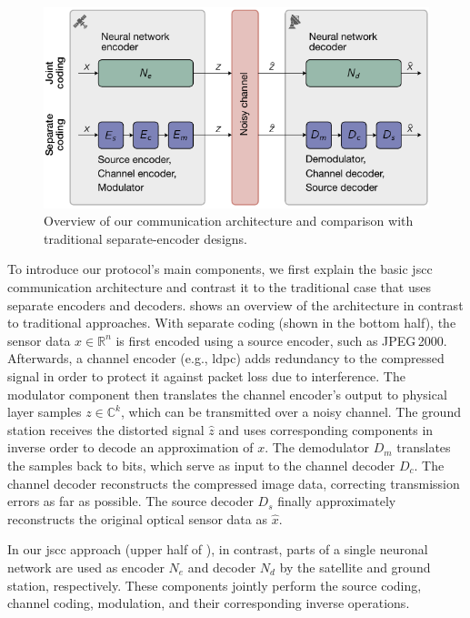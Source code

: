 \documentclass[conference]{IEEEtran}
\newcommand\jpegtwok{JPEG\,2000\xspace}
\begin{document}
\begin{figure}
  \includegraphics[width=\linewidth]{figures/coding-decoding}

  \caption{Overview of our communication architecture and comparison with traditional separate-encoder designs.}
  \label{fig:overview}
\end{figure}

To introduce our protocol's main components, we first explain the basic \ac{jscc} communication architecture and contrast it to the traditional case that uses separate encoders and decoders.
 shows an overview of the architecture in contrast to traditional approaches.
With separate coding (shown in the bottom half), the sensor data $x \in \mathbb{R}^n$ is first encoded using a source encoder, such as \jpegtwok.
Afterwards, a channel encoder (e.g., \ac{ldpc}) adds redundancy to the compressed signal in order to protect it against packet loss due to interference.
The modulator component then translates the channel encoder's output to physical layer samples $z \in \mathbb{C}^k$, which can be transmitted over a noisy channel.
The ground station receives the distorted signal $\hat{z}$ and uses corresponding components in inverse order to decode an approximation of $x$.
The demodulator $D_m$ translates the samples back to bits, which serve as input to the channel decoder $D_c$.
The channel decoder reconstructs the compressed image data, correcting transmission errors as far as possible.
The source decoder $D_s$ finally approximately reconstructs the original optical sensor data as $\hat{x}$.

In our \ac{jscc} approach (upper half of ), in contrast, parts of a single neuronal network are used as encoder $N_e$ and decoder $N_d$ by the satellite and ground station, respectively.
These components jointly perform the source coding, channel coding, modulation, and their corresponding inverse operations.
\end{document}
